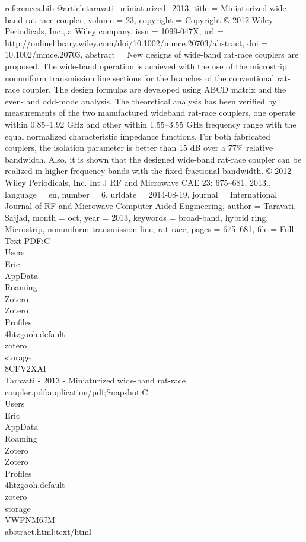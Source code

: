 \begin{filecontents*}{references.bib}
@article{taravati_miniaturized_2013,
	title = {Miniaturized wide-band rat-race coupler},
	volume = {23},
	copyright = {Copyright © 2012 Wiley Periodicals, Inc., a Wiley company},
	issn = {1099-047X},
	url = {http://onlinelibrary.wiley.com/doi/10.1002/mmce.20703/abstract},
	doi = {10.1002/mmce.20703},
	abstract = {New designs of wide-band rat-race couplers are proposed. The wide-band operation is achieved with the use of the microstrip nonuniform transmission line sections for the branches of the conventional rat-race coupler. The design formulas are developed using {ABCD} matrix and the even- and odd-mode analysis. The theoretical analysis has been verified by measurements of the two manufactured wideband rat-race couplers, one operate within 0.85–1.92 {GHz} and other within 1.55–3.55 {GHz} frequency range with the equal normalized characteristic impedance functions. For both fabricated couplers, the isolation parameter is better than 15 {dB} over a 77\% relative bandwidth. Also, it is shown that the designed wide-band rat-race coupler can be realized in higher frequency bands with the fixed fractional bandwidth. © 2012 Wiley Periodicals, Inc. Int J {RF} and Microwave {CAE} 23: 675–681, 2013.},
	language = {en},
	number = {6},
	urldate = {2014-08-19},
	journal = {International Journal of {RF} and Microwave Computer-Aided Engineering},
	author = {Taravati, Sajjad},
	month = oct,
	year = {2013},
	keywords = {broad-band, hybrid ring, Microstrip, nonuniform transmission line, rat-race},
	pages = {675--681},
	file = {Full Text PDF:C\:\\Users\\Eric\\AppData\\Roaming\\Zotero\\Zotero\\Profiles\\4htzgooh.default\\zotero\\storage\\8CFV2XAI\\Taravati - 2013 - Miniaturized wide-band rat-race coupler.pdf:application/pdf;Snapshot:C\:\\Users\\Eric\\AppData\\Roaming\\Zotero\\Zotero\\Profiles\\4htzgooh.default\\zotero\\storage\\VWPNM6JM\\abstract.html:text/html}
}


\end{filecontents*}
